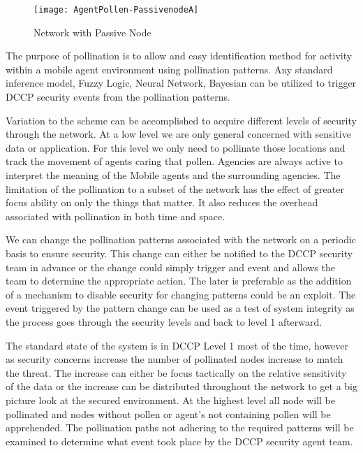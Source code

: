 \documentclass{acm_proc_article-sp}
\begin{document}
\begin{figure}
\centering
\texttt{[image: AgentPollen-PassivenodeA]}
\caption{Network with Passive Node}
\end{figure}

The purpose of pollination is to allow and easy identification method for activity within a mobile agent environment using pollination patterns. Any standard inference model, Fuzzy Logic, Neural Network, Bayesian can be utilized to trigger DCCP security events from the pollination patterns.

Variation to the scheme can be accomplished to acquire different levels of security through the network. At a low level we are only general concerned with sensitive data or application. For this level we only need to pollinate those locations and track the movement of agents caring that pollen. Agencies are always active to interpret the meaning of the Mobile agents and the surrounding agencies. The limitation of the pollination to a subset of the network has the effect of greater focus ability on only the things that matter. It also reduces the overhead associated with pollination in both time and space.

We can change the pollination patterns associated with the network on a periodic basis to ensure security. This change can either be notified to the DCCP security team in advance or the change could simply trigger and event and allows the team to determine the appropriate action. The later is preferable as the addition of a mechanism to disable security for changing patterns could be an exploit. The event triggered by the pattern change can be used as a test of system integrity as the process goes through the security levels and back to level 1 afterward.

The standard state of the system is in DCCP Level 1 most of the time, however as security concerns increase the number of pollinated nodes increase to match the threat. The increase can either be focus tactically on the relative sensitivity of the data or the increase can be distributed throughout the network to get a big picture look at the secured environment. At the highest level all node will be pollinated and nodes without pollen or agent's not containing pollen will be apprehended. The pollination paths not adhering to the required patterns will be examined to determine what event took place by the DCCP security agent team.
\end{document}
